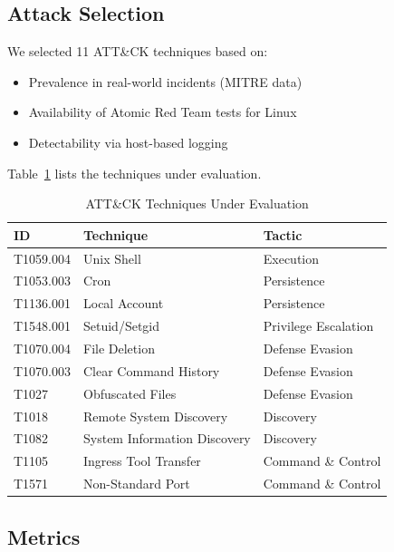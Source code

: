 \documentclass[11pt,a4paper]{article}
\begin{document}
\subsection{Attack Selection}

We selected 11 ATT\&CK techniques based on:
\begin{itemize}
    \item Prevalence in real-world incidents (MITRE data)
    \item Availability of Atomic Red Team tests for Linux
    \item Detectability via host-based logging
\end{itemize}

Table~\ref{tab:techniques} lists the techniques under evaluation.

\begin{table}[H]
    \centering
    \caption{ATT\&CK Techniques Under Evaluation}
    \label{tab:techniques}
    \begin{tabular}{lll}
        \toprule
        \textbf{ID} & \textbf{Technique} & \textbf{Tactic} \\
        \midrule
        T1059.004 & Unix Shell & Execution \\
        T1053.003 & Cron & Persistence \\
        T1136.001 & Local Account & Persistence \\
        T1548.001 & Setuid/Setgid & Privilege Escalation \\
        T1070.004 & File Deletion & Defense Evasion \\
        T1070.003 & Clear Command History & Defense Evasion \\
        T1027 & Obfuscated Files & Defense Evasion \\
        T1018 & Remote System Discovery & Discovery \\
        T1082 & System Information Discovery & Discovery \\
        T1105 & Ingress Tool Transfer & Command \& Control \\
        T1571 & Non-Standard Port & Command \& Control \\
        \bottomrule
    \end{tabular}
\end{table}

\subsection{Metrics}
\end{document}
